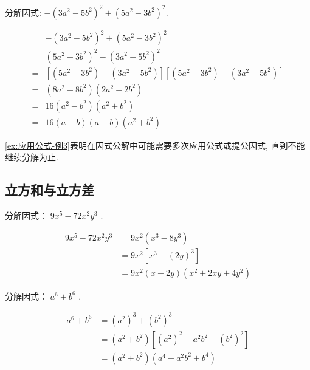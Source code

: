 \begin{example}\label{ex:应用公式-例3}
	分解因式: $-\left(3 a^{2}-5 b^{2}\right)^{2}+\left(5 a^{2}-3 b^{2}\right)^{2}$.
\end{example}
\begin{solution}
	\begin{align*}
		  & -\left(3 a^{2}-5 b^{2}\right)^{2}+\left(5 a^{2}-3 b^{2}\right)^{2}                                                                           \\
		= & \left(5 a^{2}-3 b^{2}\right)^{2}-\left(3 a^{2}-5 b^{2}\right)^{2}                                                                            \\
		= & \left[\left(5 a^{2}-3 b^{2}\right)+\left(3 a^{2}-5 b^{2}\right)\right]\left[\left(5 a^{2}-3 b^{2}\right)-\left(3 a^{2}-5 b^{2}\right)\right] \\
		= & \left(8 a^{2}-8 b^{2}\right)\left(2 a^{2}+2 b^{2}\right)                                                                                     \\
		= & 16\left(a^{2}-b^{2}\right)\left(a^{2}+b^{2}\right)                                                                                           \\
		= & 16(a+b)(a-b)\left(a^{2}+b^{2}\right)
	\end{align*}
\end{solution}
\begin{note}
	\autoref{ex:应用公式-例3}表明在因式公解中可能需要多次应用公式或提公因式, 直到不能继续分解为止.
\end{note}

\subsection{立方和与立方差}
\begin{example}
	分解因式： $9 x^{5}-72 x^{2} y^{3}$ .
\end{example}
\begin{solution}
	\begin{align*}
		9 x^{5}-72 x^{2} y^{3} & = 9 x^{2}\left(x^{3}-8 y^{3}\right)              \\
		                       & = 9 x^{2}\left[x^{3}-(2 y)^{3}\right]            \\
		                       & = 9 x^{2}(x-2 y)\left(x^{2}+2 x y+4 y^{2}\right)
	\end{align*}
\end{solution}

\begin{example}
	分解因式： $a^{6}+b^{6}$ .
\end{example}
\begin{solution}
	\begin{align*}
		a^{6}+b^{6} & = \left(a^{2}\right)^{3}+\left(b^{2}\right)^{3}                                                  \\
		            & = \left(a^{2}+b^{2}\right)\left[\left(a^{2}\right)^{2}-a^{2} b^{2}+\left(b^{2}\right)^{2}\right] \\
		            & = \left(a^{2}+b^{2}\right)\left(a^{4}-a^{2} b^{2}+b^{4}\right)
	\end{align*}
\end{solution}

